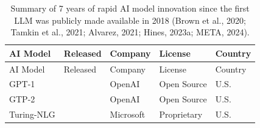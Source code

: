 \documentclass[
  letterpaper,
  DIV=11,
  numbers=noendperiod]{scrartcl}
\begin{document}
\begin{longtable}[]{@{}
  >{\raggedright\arraybackslash}p{}
  >{\raggedright\arraybackslash}p{}
  >{\raggedright\arraybackslash}p{}
  >{\raggedright\arraybackslash}p{}
  >{\raggedright\arraybackslash}p{}@{}}
\caption{Summary of 7 years of rapid AI model innovation since the first
LLM was publicly made available in 2018 (Brown et al., 2020; Tamkin et
al., 2021; Alvarez, 2021; Hines, 2023a; META, 2024).}\tabularnewline
\toprule\noalign{}
\begin{minipage}[b]{\linewidth}\raggedright
AI Model
\end{minipage} & \begin{minipage}[b]{\linewidth}\raggedright
Released
\end{minipage} & \begin{minipage}[b]{\linewidth}\raggedright
Company
\end{minipage} & \begin{minipage}[b]{\linewidth}\raggedright
License
\end{minipage} & \begin{minipage}[b]{\linewidth}\raggedright
Country
\end{minipage} \\
\midrule\noalign{}
\endfirsthead
\toprule\noalign{}
\begin{minipage}[b]{\linewidth}\raggedright
AI Model
\end{minipage} & \begin{minipage}[b]{\linewidth}\raggedright
Released
\end{minipage} & \begin{minipage}[b]{\linewidth}\raggedright
Company
\end{minipage} & \begin{minipage}[b]{\linewidth}\raggedright
License
\end{minipage} & \begin{minipage}[b]{\linewidth}\raggedright
Country
\end{minipage} \\
\midrule\noalign{}
\endhead
\bottomrule\noalign{}
\endlastfoot
GPT-1 & 2018 & OpenAI & Open Source & U.S. \\
GTP-2 & 2019 & OpenAI & Open Source & U.S. \\
Turing-NLG & 2020 & Microsoft & Proprietary & U.S. \\

\end{longtable}
\end{document}
